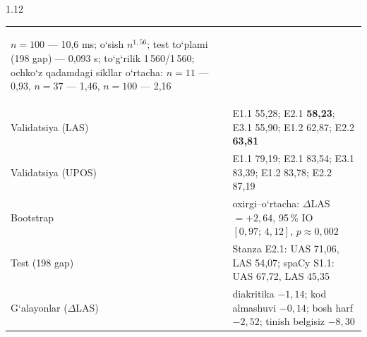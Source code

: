 \documentclass[14pt,a4paper]{extarticle}
\begin{document}
\begin{spacing}{1.12}
{\begin{tabular}{@{}>{\bfseries\raggedright\arraybackslash}p{3.6cm}>{\raggedright\arraybackslash}p{11.9cm}@{}}
          $n=100$ --- 10,6 ms; o‘sish $n^{1,56}$; test to‘plami (198 gap) --- 0,093 s; to‘g‘rilik 1\,560/1\,560;
          ochko‘z qadamdagi sikllar o‘rtacha: $n=11$ --- 0,93, $n=37$ --- 1,46, $n=100$ --- 2,16\\
  Validatsiya (LAS) & E1.1 55,28; E2.1 \textbf{58,23}; E3.1 55,90; E1.2 62,87; E2.2 \textbf{63,81}\\
  Validatsiya (UPOS) & E1.1 79,19; E2.1 83,54; E3.1 83,39; E1.2 83,78; E2.2 87,19\\
  Bootstrap & oxirgi--o‘rtacha: $\Delta$LAS $=+2{,}64$, 95\,\% IO $[0{,}97;\,4{,}12]$, $p\approx0{,}002$\\
  Test (198 gap) & Stanza E2.1: UAS 71,06, LAS 54,07; spaCy S1.1: UAS 67,72, LAS 45,35\\
  G‘alayonlar ($\Delta$LAS) & diakritika $-1{,}14$; kod almashuvi $-0{,}14$; bosh harf $-2{,}52$;
          tinish belgisiz $-8{,}30$\\
  \bottomrule
\end{tabular}}


\end{spacing}
\end{document}
